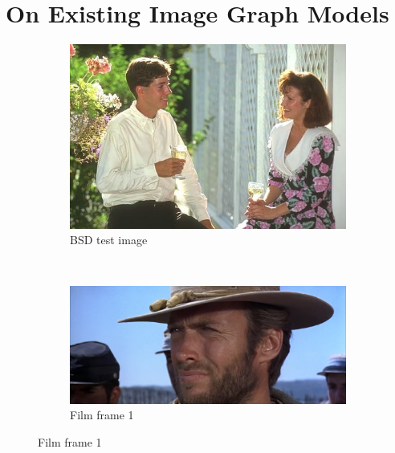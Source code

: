\documentclass{mpaper}
\begin{document}
\section{On Existing Image Graph Models}
\label{sec:image-weakness}



\begin{figure}
	\centering
	\begin{subfigure}[b]{0.22\textwidth}
		\includegraphics[width=\textwidth]{images/bsd-157055}
		\caption{BSD test image}
		\label{fig:explor-bsd}
	\end{subfigure}
	~
	\begin{subfigure}[b]{0.35\textwidth}
		\includegraphics[width=\textwidth]{images/gbu2}
		\caption{Film frame 1}
		\label{fig:explor-ff1}
	\end{subfigure}

\end{figure}
\end{document}
